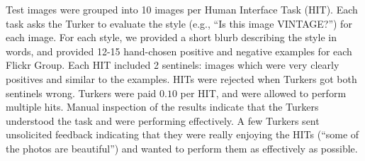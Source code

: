 Test images were grouped into 10 images per Human Interface Task (HIT). Each task asks the Turker to evaluate the style (e.g., ``Is this image VINTAGE?'') for each image.  For each style, we provided a short blurb describing the style in words, and provided 12-15 hand-chosen positive and negative examples for each Flickr Group.
Each HIT included 2 sentinels: images which were very clearly positives and similar to the examples.  HITs were rejected when Turkers got both sentinels wrong.
Turkers were paid $0.10$ per HIT, and were allowed to perform multiple hits.  Manual inspection of the results indicate that the Turkers understood the task and were performing effectively.  A few Turkers sent unsolicited feedback indicating that they were really enjoying the HITs (``some of the photos are beautiful'') and wanted to perform them as effectively as possible.
